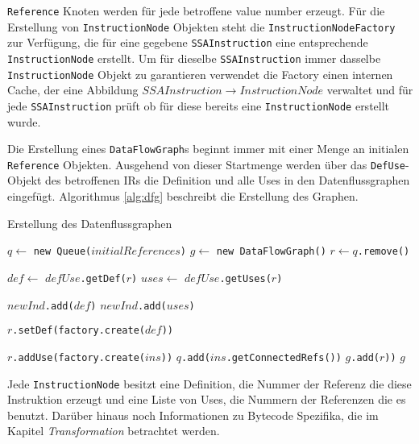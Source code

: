\texttt{Reference} Knoten werden für jede betroffene value number erzeugt. Für
die Erstellung von \texttt{InstructionNode} Objekten steht die 
\texttt{InstructionNodeFactory} zur Verfügung, die für eine gegebene 
\texttt{SSAInstruction} eine entsprechende \texttt{InstructionNode} erstellt. Um
für dieselbe \texttt{SSAInstruction} immer dasselbe \texttt{InstructionNode} 
Objekt zu garantieren verwendet die Factory einen internen Cache, der eine 
Abbildung $SSAInstruction \rightarrow InstructionNode$ verwaltet und für jede 
\texttt{SSAInstruction} prüft ob für diese bereits eine \texttt{InstructionNode} 
erstellt wurde.

Die Erstellung eines \texttt{DataFlowGraph}s beginnt immer mit einer Menge an 
initialen \texttt{Reference} Objekten. Ausgehend von dieser Startmenge werden über 
das \texttt{DefUse}-Objekt des betroffenen IRs die Definition und alle Uses in den 
Datenflussgraphen eingefügt. Algorithmus \ref{alg:dfg} beschreibt die Erstellung des 
Graphen.

\begin{algorithm}[H]
	\caption{Erstellung des Datenflussgraphen}\label{alg:dfg}
	\begin{algorithmic}[1]
		\STATE $q \gets$ \texttt{new Queue($initialReferences$)}
		\STATE $g \gets$ \texttt{new DataFlowGraph()}
			\STATE $r \gets q$\texttt{.remove()}

				\STATE $def \gets$ \texttt{$defUse$.getDef($r$)}
				\STATE $uses \gets$ \texttt{$defUse$.getUses($r$)}

				\STATE \texttt{$newInd$.add($def$)}
				\STATE \texttt{$newInd$.add($uses$)}

				\STATE \texttt{$r$.setDef(factory.create($def$))}

					\STATE \texttt{$r$.addUse(factory.create($ins$))}
				\ENDFOR
					\STATE \texttt{$q$.add($ins$.getConnectedRefs())}
				\ENDFOR
				\STATE \texttt{$g$.add($r$))}
			\ENDIF
		\ENDWHILE
		\RETURN $g$
	\end{algorithmic}
\end{algorithm}

Jede \texttt{InstructionNode} besitzt eine Definition, die Nummer der Referenz 
die diese Instruktion erzeugt und eine Liste von Uses, die Nummern der Referenzen 
die es benutzt. Darüber hinaus noch Informationen zu Bytecode Spezifika, die 
im Kapitel \textit{Transformation} betrachtet werden.

